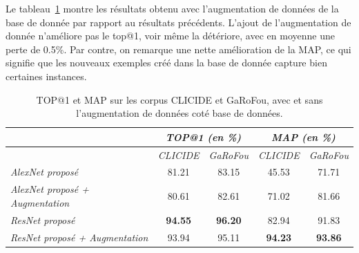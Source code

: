Le tableau~\ref{tab:resultsAugmentation} montre les résultats obtenu avec l'augmentation de données de la base de donnée par rapport au résultats précédents.
L'ajout de l'augmentation de donnée n'améliore pas le top@1, voir même la détériore, avec en moyenne une perte de 0.5\%.
Par contre, on remarque une nette amélioration de la MAP, ce qui signifie que les nouveaux exemples créé dans la base de donnée capture bien certaines instances.

\begin{table}
\centering
\begin{tabular}{|l||c|c||c|c|}
\hline & \multicolumn{2}{c||}{\emph{TOP@1 (en \%)}} &
\multicolumn{2}{c|}{\emph{MAP (en \%)}}\\
\hline & \emph{CLICIDE} & \emph{GaRoFou} & \emph{CLICIDE} & \emph{GaRoFou}\\
\hline \emph{AlexNet proposé} & 81.21 & 83.15 & 45.53 & 71.71\\
\hline \emph{AlexNet proposé + Augmentation} & 80.61 & 82.61 & 71.02 & 81.66\\ 
\hhline{|=||=|=||=|=|}
\hline \emph{ResNet proposé} & \textbf{94.55} & \textbf{96.20}
& 82.94 & 91.83\\
\hline \emph{ResNet proposé + Augmentation} & 93.94 & 95.11
& \textbf{94.23} & \textbf{93.86}\\
\hline
\end{tabular}
\caption{TOP@1 et MAP sur les corpus CLICIDE et GaRoFou, avec et sans l'augmentation de données coté base de données.}
\label{tab:resultsAugmentation}
\end{table}


